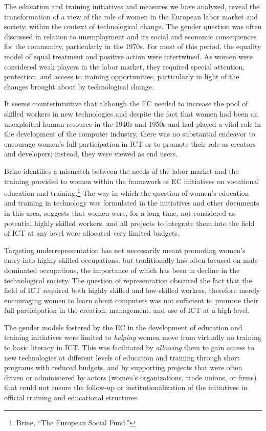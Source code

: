 \documentclass{tufte-handout}
\begin{document}
The education and training initiatives and measures we have analyzed,
reveal the transformation of a view of the role of women in the European
labor market and society, within the context of technological change.
The gender question was often discussed in relation to unemployment and
its social and economic consequences for the community, particularly in
the 1970s. For most of this period, the equality model of equal
treatment and positive action were intertwined. As women were considered
weak players in the labor market, they required special attention,
protection, and access to training opportunities, particularly in light
of the changes brought about by technological change.

It seems counterintuitive that although the EC needed to increase the
pool of skilled workers in new technologies and despite the fact that
women had been an unexploited human resource in the 1940s and 1950s and
had played a vital role in the development of the computer industry,
there was no substantial endeavor to encourage women's full
participation in ICT or to promote their role as creators and
developers; instead, they were viewed as end users.

Brine identifies a mismatch between the needs of the labor market and
the training provided to women within the framework of EC initiatives on
vocational education and training.\footnote{Brine, ``The European Social
  Fund.''} The way in which the question of women's education and
training in technology was formulated in the initiatives and other
documents in this area, suggests that women were, for a long time, not
considered as potential highly skilled workers, and all projects to
integrate them into the field of ICT at any level were allocated very
limited budgets.

Targeting underrepresentation has not necessarily meant promoting
women's entry into highly skilled occupations, but traditionally has
often focused on male-dominated occupations, the importance of which has
been in decline in the technological society. The question of
representation obscured the fact that the field of ICT required both
highly skilled and low-skilled workers, therefore merely encouraging
women to learn about computers was not sufficient to promote their full
participation in the creation, management, and use of ICT at a high
level.

The gender models fostered by the EC in the development of education and
training initiatives were limited to \emph{helping} women move from
virtually no training to basic literacy in ICT. This was facilitated by
\emph{allowing} them to gain access to new technologies at different
levels of education and training through short programs with reduced
budgets, and by supporting projects that were often driven or
administered by actors (women's organizations, trade unions, or firms)
that could not ensure the follow-up or institutionalization of the
initiatives in official training and educational structures.
\end{document}
